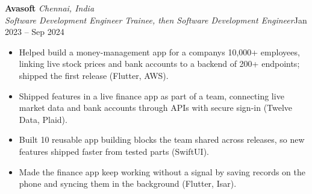 \documentclass[a4paper,11pt]{article}
\newcommand{\role}[4]{%
  \textbf{#1}{\color{muted}\,\textperiodcentered\,\textit{#2}}\\
  \textit{#4}\hfill{\color{muted}#3}\par}
\newcommand{\gap}{\vspace{5pt}}
\begin{document}
\gap
{}
\role{Avasoft}{Chennai, India}{Jan 2023 – Sep 2024}{Software Development Engineer Trainee, then Software Development Engineer}
\begin{itemize}
  \item Helped build a money-management app for a company\textquotesingle{}s 10,000+ employees, linking live stock prices and bank accounts to a backend of 200+ endpoints; shipped the first release (Flutter, AWS).
  \item Shipped features in a live finance app as part of a team, connecting live market data and bank accounts through APIs with secure sign-in (Twelve Data, Plaid).
  \item Built 10 reusable app building blocks the team shared across releases, so new features shipped faster from tested parts (SwiftUI).
  \item Made the finance app keep working without a signal by saving records on the phone and syncing them in the background (Flutter, Isar).
\end{itemize}
\end{document}

